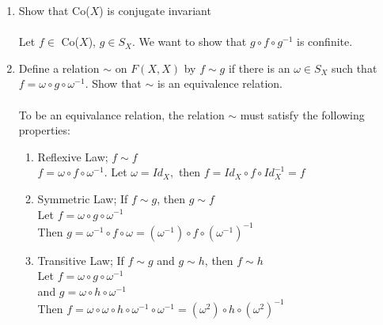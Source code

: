 \documentclass[11pt]{article}
\begin{document}
\begin{enumerate}
\newpage
\item Show that Co($X$) is conjugate invariant
\\
\\
Let $f \in $ Co($X$), $g \in S_X$.  We want to show that $g \circ f \circ g^{-1}$ is confinite.\\

\newpage
\item Define a relation $\sim$ on $F(X, X)$ by $f \sim g$ if there is an $\omega \in S_X$ such that $f = \omega \circ g \circ \omega^{-1}$.  Show that $\sim$ is an equivalence relation.\\
\\
To be an equivalance relation, the relation $\sim$ must satisfy the following properties:
\begin{enumerate}
\item Reflexive Law; $f \sim f$\\
$f = \omega \circ f \circ \omega^{-1}$.  Let $\omega = Id_X,$ then $f = Id_X \circ f \circ Id_X^{-1} = f$ 
\item Symmetric Law; If $f \sim g$, then $g \sim f$\\
Let $f = \omega \circ g \circ \omega^{-1}$\\
Then $g = \omega^{-1} \circ f \circ \omega = (\omega^{-1}) \circ f \circ (\omega^{-1})^{-1}$
\item Transitive Law; If $f \sim g$ and $g \sim h$, then $f \sim h$\\
Let $f = \omega \circ g \circ \omega^{-1}$\\
and $g = \omega \circ h \circ \omega^{-1}$\\
Then $f = \omega \circ \omega \circ h \circ \omega^{-1} \circ \omega^{-1} = (\omega^2) \circ h \circ (\omega^2)^{-1}$
\end{enumerate}


\end{enumerate}
\end{document}
